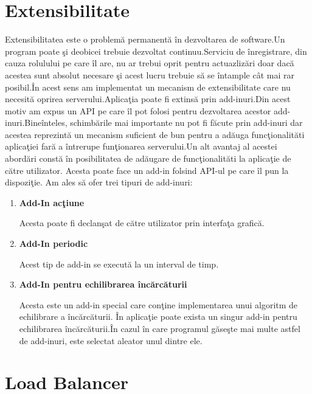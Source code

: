 \documentclass[a4paper,12pt]{report}
\begin{document}
\section{Extensibilitate}
Extensibilitatea este o problem\u a permanent\u a \^in dezvoltarea de software.Un program poate \c si deobicei 
trebuie dezvoltat continuu.Serviciu de \^inregistrare, din cauza rolulului pe care \^il are, nu ar trebui oprit 
pentru actuazliz\u ari doar dac\u a acestea sunt absolut necesare \c si acest lucru trebuie s\u a se \^intample
c\^at mai rar posibil.\^In acest sens am implementat un mecanism de extensibilitate care nu necesit\u a oprirea
serverului.Aplica\c tia poate fi extins\u a prin add-inuri.Din acest motiv am expus un API pe care \^il pot folosi 
pentru dezvoltarea acestor add-inuri.Bine\^inteles, schimb\u arile mai importante nu pot fi f\u acute prin add-inuri
dar acestea reprezint\u a un mecanism suficient de bun pentru a ad\u auga func\c tionalit\u ati aplica\c tiei far\u a
a \^intrerupe fun\c tionarea serverului.Un alt avantaj al acestei abord\u ari const\u a \^in posibilitatea de 
ad\u augare de func\c tionalit\u ati la aplica\c tie de c\u atre utilizator. Acesta poate face un add-in 
folsind API-ul pe care \^il pun la dispozi\c tie.
Am ales s\u a ofer trei tipuri de add-inuri:
\begin{enumerate}
		\item \textbf{Add-In ac\c tiune}

			Acesta poate fi declan\c sat de c\u atre utilizator prin interfa\c ta grafic\u a.
		\item \textbf{Add-In periodic}

			Acest tip de add-in se execut\u a la un interval de timp.
		\item \textbf{Add-In pentru echilibrarea \^inc\u arc\u aturii}
		
			Acesta este un add-in special care con\c tine implementarea unui algoritm de echilibrare a \^inc\u arc\u aturii.
			\^In aplica\c tie poate exista un singur add-in pentru echilibrarea \^inc\u arc\u aturii.\^In cazul \^in care
			programul g\u ase\c ste mai multe astfel de add-inuri, este selectat aleator unul dintre ele.
\end{enumerate}

\section{Load Balancer}
\end{document}
